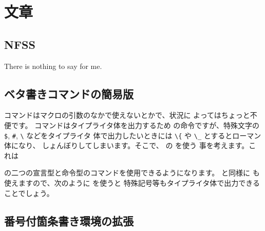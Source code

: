 ﻿\chapter{文章}

\section{NFSS}
There is nothing to say for me.

\section{ベタ書きコマンドの簡易版\texorpdfstring{\zdash}{---}}
 コマンドはマクロの引数のなかで使えないとかで、状況に
よってはちょっと不便です。  コマンドはタイプライタ体を出力するため
の命令ですが、特殊文字の \verb|$|, \verb|#|, \verb|\| などをタイプライタ
体で出力したいときには \verb|\{| や \verb|\_| とするとローマン体になり、
しょんぼりしてしまいます。そこで、 の  を使う
事を考えます。これは
\begin{Syntax}
\end{Syntax}
の二つの宣言型と命令型のコマンドを使用できるようになります。
 と同様に  も使えますので、次のように  を使うと
特殊記号等もタイプライタ体で出力できることでしょう。
\begin{InOut}
\usepackage{cmtt}
\mtt{\\, \{, \}, \_, \^, \$, \%}
\mtt{\&, \#, \~, \", \' \ , \|, \`}
\end{InOut}


\section{番号付箇条書き環境の拡張\texorpdfstring{\zdash}{---}}

